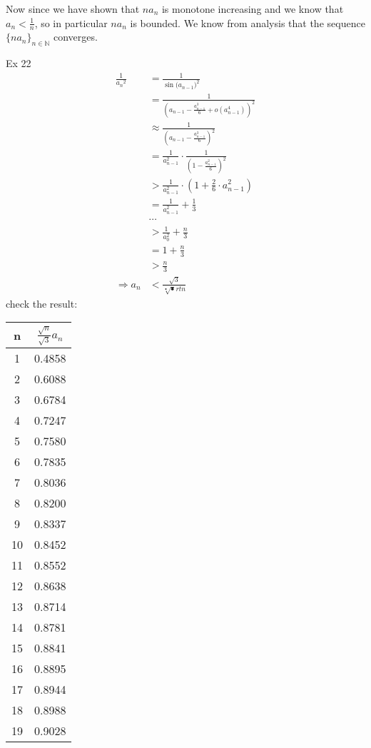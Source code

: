 \documentclass{article}
\newcommand{\NaturalNum}{\ensuremath{\mathbb{N}}}
\begin{document}
Now since we have shown that $na_n$ is monotone increasing and we know that $a_n < \frac{1}{n}$, so in particular $na_n$ is bounded. We know from analysis that the sequence $\{na_n\}_{n\in \NaturalNum}$ converges.

Ex 22\\
\begin{align*}
	\frac{1}{{a_n}^2} &= \frac{1}{{\sin(a_{n-1}})^2} \\
		&= \frac{1}{(a_{n-1} - \frac{a_{n-1}^3}{6} + o(a_{n-1}^4))^2}\\
		&\approx \frac{1}{(a_{n-1} -\frac{a_{n-1}^3}{6})^2}\\
		&= \frac{1}{a_{n-1}^2} \cdot \frac{1}{(1-\frac{a_{n-1}^2}{6})^2}\\
		&> \frac{1}{a_{n-1}^2} \cdot (1 + \frac{2}{6}\cdot a_{n-1}^2)\\
		&= \frac{1}{a_{n-1}^2} + \frac{1}{3} \\
		&\cdots\\
		&> \frac{1}{a_{0}^2} + \frac{n}{3}\\
		&= 1 + \frac{n}{3} \\
		&> \frac{n}{3}\\
	\Rightarrow a_n &< \frac{\sqrt{3}}{\sqrt[•]{•}rt{n}}
\end{align*}
check the result:
\begin{center}
	\begin{tabular}{||c c||} 
 \hline
 n & $\frac{\sqrt{n}}{\sqrt{3}}a_n$\\ [0.5ex] 
  \hline\hline
 1 & 0.4858\\
  2 & 0.6088\\
  3 & 0.6784\\
  4 & 0.7247\\
  5 & 0.7580\\
  6 & 0.7835\\
  7 & 0.8036\\
  8 & 0.8200\\
  9 & 0.8337\\
 10 & 0.8452\\
 11 & 0.8552\\
 12 & 0.8638\\
 13 & 0.8714\\
 14 & 0.8781\\
 15 & 0.8841\\
 16 & 0.8895\\
 17 & 0.8944\\
 18 & 0.8988\\
 19 & 0.9028\\[1ex] 
 \hline
\end{tabular}
\end{center}
\end{document}
